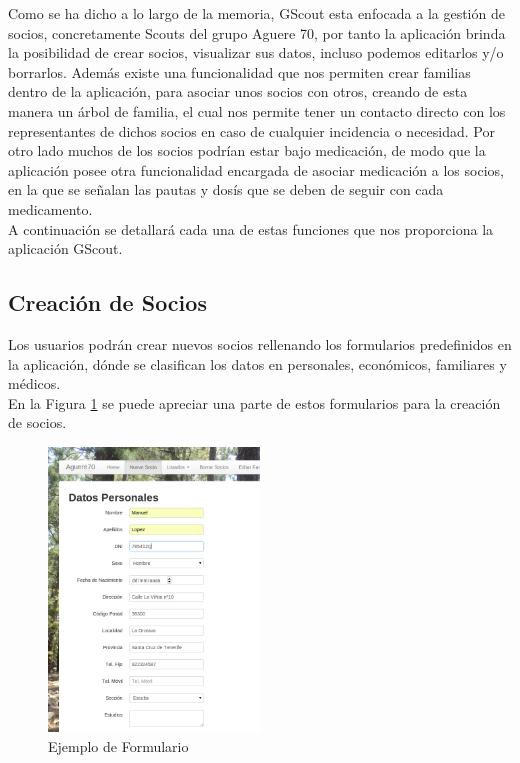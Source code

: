 Como se ha dicho a lo largo de la memoria, GScout esta enfocada a la gestión de socios, concretamente Scouts del grupo Aguere 70, 
por tanto la aplicación brinda la posibilidad de crear socios, visualizar sus datos, incluso podemos editarlos y/o borrarlos. Además existe una funcionalidad que nos permiten 
crear familias dentro de la aplicación, para asociar unos socios con otros, creando de esta manera un árbol de familia, el cual nos permite tener un contacto directo con los representantes de dichos
socios en caso de cualquier incidencia o necesidad. Por otro lado muchos de los socios podrían estar bajo medicación, de modo que la aplicación posee otra funcionalidad encargada de asociar medicación a los socios,
en la que se señalan las pautas y dosís que se deben de seguir con cada medicamento.\\

A continuación se detallará cada una de estas funciones que nos proporciona la aplicación GScout.\\

\subsection{Creación de Socios}

Los usuarios podrán crear nuevos socios rellenando los formularios predefinidos en la aplicación, dónde se clasifican los datos en personales, económicos, familiares y médicos.\\

En la Figura \ref{fig:form} se puede apreciar una parte de estos formularios para la creación de socios.

\begin{figure}[H]
\begin{center}
\includegraphics[width=0.5\textwidth]{images/ejemplo_formulario_personal.jpg}
\caption{Ejemplo de Formulario}
\label{fig:form}
\end{center}
\end{figure}

